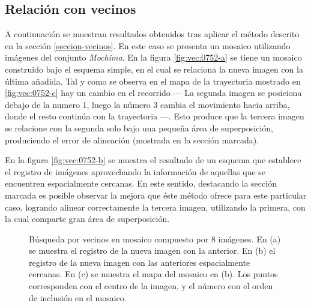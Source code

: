 \subsection*{Relación con vecinos}

A continuación se muestran resultados obtenidos tras aplicar el método descrito en la sección \ref{seccion-vecinos}. En este caso se presenta un mosaico utilizando imágenes del conjunto \textit{Mochima}. En la figura \ref{fig:vec:0752-a} se tiene un mosaico construido bajo el esquema simple, en el cual se relaciona la nueva imagen con la última añadida. Tal y como se observa en el mapa de la trayectoria mostrado en \ref{fig:vec:0752-c} hay un cambio en el recorrido --- La segunda imagen se posiciona debajo de la numero 1, luego la número 3 cambia el movimiento hacia arriba, donde el resto continúa con la trayectoria ---. Esto produce que la tercera imagen se relacione con la segunda solo bajo una pequeña área de superposición, produciendo el error de alineación (mostrada en la sección marcada).

En la figura \ref{fig:vec:0752-b} se muestra el resultado de un esquema que establece el registro de imágenes aprovechando la información de aquellas que se encuentren espacialmente cercanas. En este sentido, destacando la sección marcada es posible observar la mejora que éste método ofrece para este particular caso, logrando alinear correctamente la tercera imagen, utilizando la primera, con la cual comparte gran área de superposición.  



\begin{figure}[h]
	\centering     %
	\hspace{1mm}%
	\hspace{1mm}%
	
	\caption[Busqueda de vecinos: \textit{Búsqueda por vecinos: \textit{Mochima}}]{Búsqueda por vecinos en mosaico compuesto por 8 imágenes. En (a) se muestra el registro de la nueva imagen con la anterior. En (b) el registro de la nueva imagen con las anteriores espacialmente cercanas. En (c) se muestra el mapa del mosaico en (b). Los puntos corresponden con el centro de la imagen, y el número con el orden de inclusión en el mosaico.}
	\label{imagen:vecinos:0752}
\end{figure}



